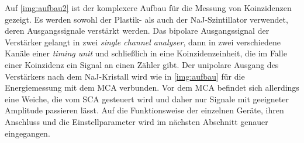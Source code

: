 Auf \autoref{img:aufbau2} ist der komplexere Aufbau für die Messung von Koinzidenzen gezeigt.
Es werden sowohl der Plastik- als auch der NaJ-Szintillator verwendet, deren Ausgangssignale
verstärkt werden.
Das bipolare Ausgangssignal der Verstärker gelangt in zwei \emph{single channel analyser},
dann in zwei verschiedene Kanäle einer \emph{timing unit} und schließlich in eine Koinzidenzeinheit,
die im Falle einer Koinzidenz ein Signal an einen Zähler gibt.
Der unipolare Ausgang des Verstärkers nach dem NaJ-Kristall wird wie in \autoref{img:aufbau}
für die Energiemessung mit dem MCA verbunden. Vor dem MCA befindet sich allerdings eine Weiche,
die vom SCA gesteuert wird und daher nur Signale mit geeigneter Amplitude passieren lässt.
Auf die Funktionsweise der einzelnen Geräte, ihren Anschluss und die Einstellparameter
wird im nächsten Abschnitt genauer eingegangen.



